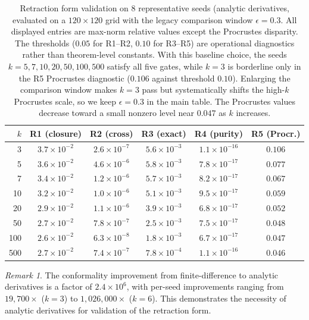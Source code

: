 \documentclass[11pt,a4paper]{article}
\theoremstyle{plain}
\theoremstyle{definition}
\theoremstyle{remark}
\newtheorem{remark}[theorem]{Remark}
\begin{document}
\begin{table}[ht]
\centering
\caption{Retraction form validation on $8$ representative seeds (analytic
  derivatives, evaluated on a $120 \times 120$ grid with the legacy
  comparison window $\epsilon = 0.3$.  All displayed entries are max-norm
  relative values except the Procrustes disparity.  The thresholds
  ($0.05$ for R1--R2, $0.10$ for R3--R5) are operational diagnostics rather
  than theorem-level constants.  With this baseline choice, the seeds
  $k=5,7,10,20,50,100,500$ satisfy all five gates, while $k=3$ is
  borderline only in the R5 Procrustes diagnostic
  ($0.106$ against threshold $0.10$).  Enlarging the comparison window makes
  $k=3$ pass but systematically shifts the high-$k$ Procrustes scale, so
  we keep $\epsilon=0.3$ in the main table.  The Procrustes values decrease
  toward a small nonzero level near $0.047$ as $k$ increases.}
\label{tab:retraction}
\smallskip
\begin{tabular}{@{}rccccc@{}}
\toprule
$k$ & R1 (closure) & R2 (cross) & R3 (exact) & R4 (purity) & R5 (Procr.) \\
\midrule
3   & $3.7 \times 10^{-2}$ & $2.6 \times 10^{-7}$ & $5.6 \times 10^{-3}$ & $1.1 \times 10^{-16}$ & $0.106$ \\
5   & $3.6 \times 10^{-2}$ & $4.6 \times 10^{-6}$ & $5.8 \times 10^{-3}$ & $7.8 \times 10^{-17}$ & $0.077$ \\
7   & $3.4 \times 10^{-2}$ & $1.2 \times 10^{-6}$ & $5.7 \times 10^{-3}$ & $8.2 \times 10^{-17}$ & $0.067$ \\
10  & $3.2 \times 10^{-2}$ & $1.0 \times 10^{-6}$ & $5.1 \times 10^{-3}$ & $9.5 \times 10^{-17}$ & $0.059$ \\
20  & $2.9 \times 10^{-2}$ & $1.1 \times 10^{-6}$ & $3.9 \times 10^{-3}$ & $6.8 \times 10^{-17}$ & $0.052$ \\
50  & $2.7 \times 10^{-2}$ & $7.8 \times 10^{-7}$ & $2.5 \times 10^{-3}$ & $7.5 \times 10^{-17}$ & $0.048$ \\
100 & $2.6 \times 10^{-2}$ & $6.3 \times 10^{-8}$ & $1.8 \times 10^{-3}$ & $6.7 \times 10^{-17}$ & $0.047$ \\
500 & $2.7 \times 10^{-2}$ & $7.4 \times 10^{-7}$ & $7.8 \times 10^{-4}$ & $1.1 \times 10^{-16}$ & $0.046$ \\
\bottomrule
\end{tabular}
\end{table}

\begin{remark}
  The conformality improvement from finite-difference to analytic
  derivatives is a factor of $2.4 \times 10^6$, with per-seed
  improvements ranging from $19{,}700\times$ ($k=3$) to
  $1{,}026{,}000\times$ ($k=6$).  This demonstrates the necessity
  of analytic derivatives for validation of the retraction form.
\end{remark}
\end{document}
